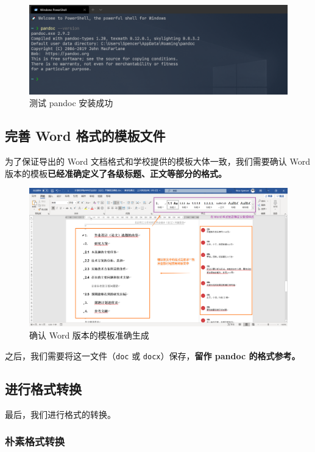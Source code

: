 \begin{figure}[H]
  \centering
  \includegraphics[width=\textwidth]{images/pandoc_test.png}
  \caption{测试 pandoc 安装成功}
  \label{pandoc_test}
\end{figure}

\subsection{完善 Word 格式的模板文件}

为了保证导出的 Word 文档格式和学校提供的模板大体一致，我们需要确认 Word 版本的模板\textbf{已经准确定义了各级标题、正文等部分的格式。}

\begin{figure}[H]
  \center
  \includegraphics[width=\textwidth]{images/latex_pandoc_word.png}
  \caption{确认 Word 版本的模板准确生成}
  \label{latex_pandoc_word}
\end{figure}

之后，我们需要将这一文件（\texttt{doc} 或 \texttt{docx}）保存，\textbf{留作 pandoc 的格式参考。}

\subsection{进行格式转换}

最后，我们进行格式的转换。

\subsubsection{朴素格式转换}


